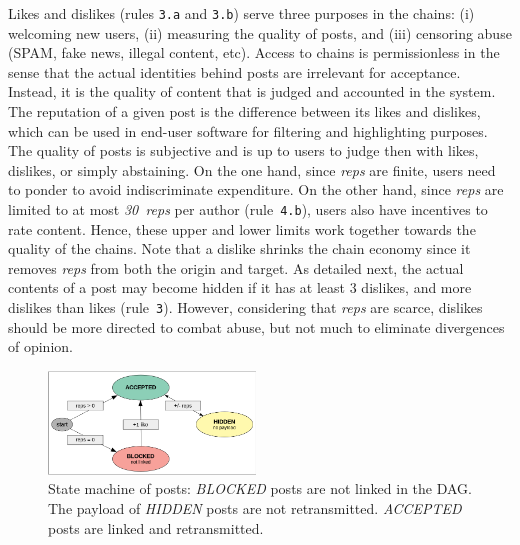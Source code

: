 \documentclass[10pt,journal,compsoc]{IEEEtran}
\newcommand{\reps}     {\emph{reps}\xspace}
\newcommand{\nreps}[1] {\emph{#1~reps\xspace}}
\begin{document}
Likes and dislikes (rules \texttt{3.a} and \texttt{3.b}) serve three purposes
in the chains:
    (i) welcoming new users,
    (ii) measuring the quality of posts, and
    (iii) censoring abuse (SPAM, fake news, illegal content, etc).
%
Access to chains is permissionless in the sense that the actual identities
behind posts are irrelevant for acceptance.
Instead, it is the quality of content that is judged and accounted in the
system.
%
The reputation of a given post is the difference between its likes and
dislikes, which can be used in end-user software for filtering and highlighting
purposes.
%
The quality of posts is subjective and is up to users to judge then with likes,
dislikes, or simply abstaining.
%
On the one hand, since \reps are finite, users need to ponder to avoid
indiscriminate expenditure.
On the other hand, since \reps are limited to at most \nreps{30} per author
(rule~\texttt{4.b}), users also have incentives to rate content.
Hence, these upper and lower limits work together towards the quality of the
chains.
%
Note that a dislike shrinks the chain economy since it removes \reps from both
the origin and target.
As detailed next, the actual contents of a post may become hidden if it has at
least 3 dislikes, and more dislikes than likes (rule~\texttt{3}).
However, considering that \reps are scarce, dislikes should be more directed to
combat abuse, but not much to eliminate divergences of opinion.

\begin{figure}
\centering
\includegraphics[width=0.49\textwidth]{state.png}
\caption{
    State machine of posts:
    \emph{BLOCKED} posts are not linked in the DAG.
    The payload of \emph{HIDDEN} posts are not retransmitted.
    \emph{ACCEPTED} posts are linked and retransmitted.
}
\label{fig.state}
\end{figure}
\end{document}
